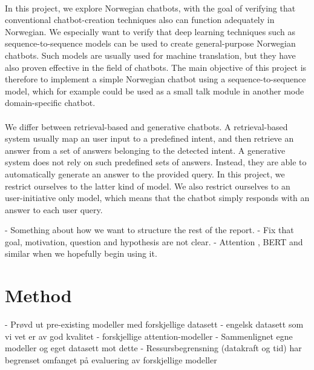 \documentclass{article}
\begin{document}
\paragraph{}
In this project, we explore Norwegian chatbots, with the goal of verifying that
conventional chatbot-creation techniques also can function adequately in
Norwegian. We especially want to verify that deep learning techniques such as
sequence-to-sequence models \cite{Cho2014} can be used to create
general-purpose Norwegian chatbots. Such models are usually used for machine
translation, but they have also proven effective in the field of chatbots. The
main objective of this project is therefore to implement a simple Norwegian
chatbot using a sequence-to-sequence model, which for example could be used as
a small talk module in another mode domain-specific chatbot.

\paragraph{}
We differ between retrieval-based and generative chatbots. A retrieval-based
system usually map an user input to a predefined intent, and then retrieve an
answer from a set of answers belonging to the detected intent. A generative
system does not rely on such predefined sets of answers.  Instead, they are
able to automatically generate an answer to the provided query. In this
project, we restrict ourselves to the latter kind of model. We also restrict
ourselves to an user-initiative only model, which means that the chatbot simply
responds with an answer to each user query.

\if
- Something about how we want to structure the rest of the report.  
- Fix that goal, motivation, question and hypothesis are not clear.  
- Attention \cite{Bahdanau2015}, BERT and similar when we hopefully begin using it.
\fi


\section*{Method}
\if
 - Prøvd ut pre-existing modeller med forskjellige datasett
    - engelsk datasett som vi vet er av god kvalitet
    - forskjellige attention-modeller
 - Sammenlignet egne modeller og eget datasett mot dette
 - Ressursbegrensning (datakraft og tid) har begrenset omfanget på evaluering
 av forskjellige modeller
\fi
\end{document}
